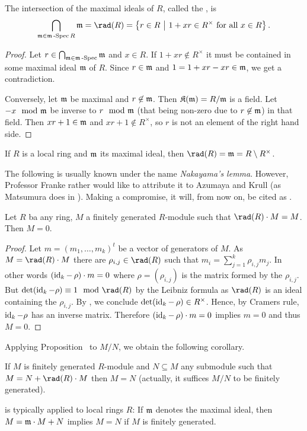 \documentclass[a4paper,parskip=half,numbers=enddot, DIV=12]{scrreprt}
\begin{document}
\begin{prop}
    The intersection of the maximal ideals of $R$, called the , is
    \begin{align}\lbl{eq:JacobsonRadical}
        \bigcap_{\mm \in\mSpec R} \mm = \rad(R) = \left\{r\in R\st1+xr\in R^\times \text{ for all } x\in R\right\}.
    \end{align}
\end{prop}
\begin{proof}
    Let $r\in \bigcap_{\mathfrak{m}\in\mathfrak{m}\operatorname{-Spec}} \mathfrak{m}$ and $x\in R$. If $1+xr\not\in R^\times$ it must be contained in some maximal ideal $\mathfrak{m}$ of $R$. Since $r\in\mathfrak{m}$ and $1 = 1+xr - xr\in\mathfrak{m}$, we get a contradiction. 
    
    Conversely, let $\mathfrak{m}$ be maximal and $r\not\in\mathfrak{m}$. Then $\mathfrak{K}(\mathfrak{m}) = R/\mathfrak{m}$ is a field. Let $-x\mod {\mathfrak{m}}$ be inverse to $r\mod{\mathfrak{m}}$ (that being non-zero due to $r\not\in\mathfrak{m}$) in that field. Then $xr+1\in\mathfrak{m}$ and $xr+1\not\in R^\times$, so $r$ is not an element of the right hand side.
\end{proof}
\begin{example}
    If $R$ is a local ring and $\mathfrak{m}$ its maximal ideal, then $\rad (R) = \mm = R\setminus R^\times$.
\end{example}
The following is usually known under the name \emph{Nakayama's lemma}. However, Professor Franke rather would like to attribute it to Azumaya and Krull (as Matsumura does in \cite{matsumuraCRT}). Making a compromise, it will, from now on, be cited as \NAK.
\begin{prop}
        Let $R$ ba any ring, $M$ a finitely generated $R$-module such that $\rad(R)\cdot M = M$. Then $M=0$.
\end{prop}
\begin{proof}
    Let $m=(m_1,\ldots,m_k)^t$ be a vector of generators of $M$. As $M=\rad(R) \cdot M$ there are $\rho_{i,j}\in\rad(R)$ such that $m_i = \sum_{j=1}^k \rho_{i,j} m_j$. In other words $(\operatorname{id}_k -\,\rho)\cdot m=0$ where $\rho=(\rho_{i,j})$ is the matrix formed by the $\rho_{i,j}$. But $\det(\id_k - \rho) \equiv 1\mod \rad(R)$ by the Leibniz formula as $\rad(R)$ is an ideal containing the $\rho_{i,j}$. By , we conclude $\operatorname{det}(\operatorname{id}_k -\,\rho)\in R^\times$. Hence, by Cramers rule, $\operatorname{id}_k-\rho$ has an inverse matrix. Therefore $(\operatorname{id}_k -\,\rho) \cdot m = 0$ implies $m=0$ and thus $M=0$.
\end{proof}
Applying Proposition~ to $M/N$, we obtain the following corollary.
\begin{cor}
    If $M$ is finitely generated $R$-module and $N\subseteq M$ any submodule such that $M = N+\rad(R)\cdot M$ then $M=N$ (actually, it suffices $M/N$ to be finitely generated).
\end{cor}
\begin{rem*}
    {\NAK} is typically applied to local rings $R$: If $\mathfrak{m}$ denotes the maximal ideal, then $M= \mathfrak{m}\cdot M +N$ implies $M=N$ if $M$ is finitely generated.
\end{rem*}
\end{document}
